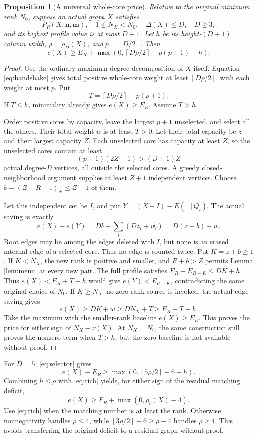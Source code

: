 \documentclass[11pt,a4paper]{article}
\newcommand{\nn}{\mathbf n}\newcommand{\mm}{\mathbf m}
\newcommand{\sq}{\bigsqcup}
\newcommand{\floor}[1]{\left\lfloor#1\right\rfloor}
\newcommand{\ceil}[1]{\left\lceil#1\right\rceil}
\newtheorem{proposition}[theorem]{Proposition}
\theoremstyle{definition}
\begin{document}
\begin{proposition}[A universal whole-core price]\label{prop:selector}
Relative to the original minimum rank $N_0$, suppose an actual graph $X$ satisfies
\[
P_R(X;\nn,\mm),\quad 1\le N_X<N_0,\quad
\Delta(X)\le D,\quad D\ge3,
\]
and its highest profile value is at most $D+1$. Let $h$ be its height-$(D+1)$ column width, $\rho=\rho_D(X)$, and $p=\floor{D/2}$. Then
\begin{equation}\label{eq:selector}
e(X)\ge E_R+\max\left(0,\ceil{D\rho/2}-p(p+1)-h\right).
\end{equation}
\end{proposition}
\begin{proof}
Use the ordinary maximum-degree decomposition of $X$ itself. Equation \eqref{eq:handshake} gives total positive whole-core weight at least $\ceil{D\rho/2}$, with each weight at most $p$. Put
\[
T=\ceil{D\rho/2}-p(p+1).
\]
If $T\le h$, minimality already gives $e(X)\ge E_R$. Assume $T>h$.

Order positive cores by capacity, leave the largest $p+1$ unselected, and select all the others. Their total weight $w$ is at least $T>0$. Let their total capacity be $z$ and their largest capacity $Z$. Each unselected core has capacity at least $Z$, so the unselected cores contain at least
\[
(p+1)(2Z+1)>(D+1)Z
\]
actual degree-$D$ vertices, all outside the selected cores. A greedy closed-neighborhood argument supplies at least $Z+1$ independent vertices. Choose
$b=(Z-R+1)_+\le Z-1$ of them.

Let this independent set be $I$, and put
$Y=(X-I)-E(\sq Q_i)$. The actual saving is exactly
\[
e(X)-e(Y)=Db+\sum_i(Dz_i+w_i)=D(z+b)+w.
\]
Root edges may be among the edges deleted with $I$, but none is an erased internal edge of a selected core. Thus no edge is counted twice.
Put $K=z+b\ge1$. If $K<N_X$, the new rank is positive and smaller,
and $R+b>Z$ permits Lemma \ref{lem:menu} at every new pair.
The full profile satisfies $E_R-E_{R+K}\le DK+h$.
Thus $e(X)<E_R+T-h$ would give $e(Y)<E_{R+K}$, contradicting the same
original choice of $N_0$.
If $K\ge N_X$, no zero-rank source is invoked: the actual edge saving gives
\[
e(X)\ge DK+w\ge DN_X+T\ge E_R+T-h.
\]
Take the maximum with the smaller-rank baseline $e(X)\ge E_R$.
This proves the price for either sign of $N_X-\nu(X)$.
At $N_X=N_0$, the same construction still proves the nonzero term when $T>h$,
but the zero baseline is not available without proof.
\end{proof}

For $D=5$, \eqref{eq:selector} gives
\[
e(X)-E_R\ge\max(0,\ceil{5\rho/2}-6-h).
\]
Combining $h\le\rho$ with \eqref{eq:rich} yields, for either sign of the residual matching deficit,
\begin{equation}\label{eq:five-safe}
e(X)\ge E_R+\max(0,\rho_5(X)-4).
\end{equation}
Use \eqref{eq:rich} when the matching number is at least the rank. Otherwise nonnegativity handles $\rho\le4$, while
$\ceil{3\rho/2}-6\ge\rho-4$ handles $\rho\ge4$. This avoids transferring the original deficit to a residual graph without proof.
\end{document}
